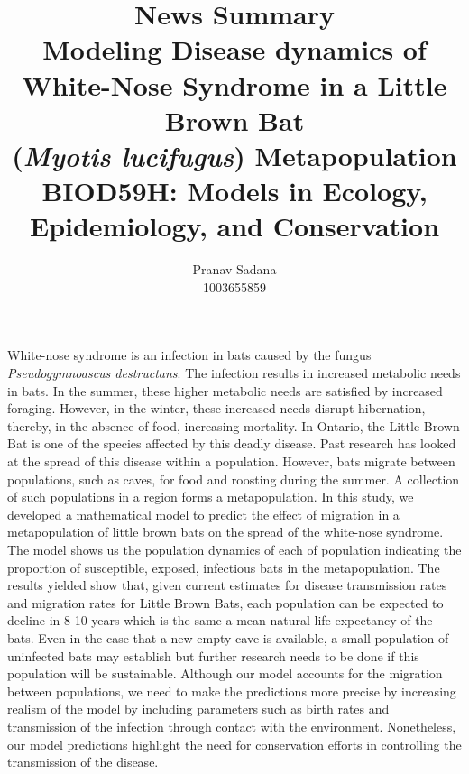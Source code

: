 \documentclass[11pt, letter]{article}
\title{\textbf{News Summary\\ Modeling Disease dynamics of White-Nose Syndrome in a Little Brown Bat \\ (\textit{Myotis lucifugus}) Metapopulation \\ \Large BIOD59H: Models in Ecology, Epidemiology, and Conservation}}
\author{\sc Pranav Sadana \\ 1003655859}
\date{}
\begin{document}
\maketitle
\hrulefill

\thispagestyle{empty}

\vspace{1cm}

White-nose syndrome is an infection in bats caused by the fungus \textit{Pseudogymnoascus destructans}. The infection results in increased metabolic needs in bats. In the summer, these higher metabolic needs are satisfied by increased foraging. However, in the winter, these increased needs disrupt hibernation, thereby, in the absence of food, increasing mortality. In Ontario, the Little Brown Bat is one of the species affected by this deadly disease. Past research has looked at the spread of this disease within a population. However, bats migrate between populations, such as caves, for food and roosting during the summer. A collection of such populations in a region forms a metapopulation. In this study, we developed a mathematical model to predict the effect of migration in a metapopulation of little brown bats on the spread of the white-nose syndrome. The model shows us the population dynamics of each of population indicating the proportion of susceptible, exposed, infectious bats in the metapopulation. The results yielded show that, given current estimates for disease transmission rates and migration rates for Little Brown Bats, each population can be expected to decline in 8-10 years which is the same a mean natural life expectancy of the bats. Even in the case that a new empty cave is available, a small population of uninfected bats may establish but further research needs to be done if this population will be sustainable. Although our model accounts for the migration between populations, we need to make the predictions more precise by increasing realism of the model by including parameters such as birth rates and transmission of the infection through contact with the environment. Nonetheless, our model predictions highlight the need for conservation efforts in controlling the transmission of the disease. 
\end{document}
